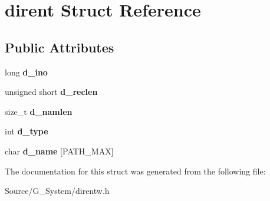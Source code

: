 \hypertarget{structdirent}{}\section{dirent Struct Reference}
\label{structdirent}
\subsection*{Public Attributes}
\begin{DoxyCompactItemize}
\item 
long {\bfseries d\+\_\+ino}\hypertarget{structdirent_acb6fecfb0e0f6fdc226dff8d56c3da4a}{}\label{structdirent_acb6fecfb0e0f6fdc226dff8d56c3da4a}

\item 
unsigned short {\bfseries d\+\_\+reclen}\hypertarget{structdirent_a90dc47836e8ef510437317876368859e}{}\label{structdirent_a90dc47836e8ef510437317876368859e}

\item 
size\+\_\+t {\bfseries d\+\_\+namlen}\hypertarget{structdirent_a09ced068b03cdb339e34840c8b709621}{}\label{structdirent_a09ced068b03cdb339e34840c8b709621}

\item 
int {\bfseries d\+\_\+type}\hypertarget{structdirent_ad6a736cb04c7295e8f97f708324b3500}{}\label{structdirent_ad6a736cb04c7295e8f97f708324b3500}

\item 
char {\bfseries d\+\_\+name} \mbox{[}P\+A\+T\+H\+\_\+\+M\+AX\mbox{]}\hypertarget{structdirent_a6c68ac080755453ec52de202e91de59b}{}\label{structdirent_a6c68ac080755453ec52de202e91de59b}

\end{DoxyCompactItemize}


The documentation for this struct was generated from the following file\+:\begin{DoxyCompactItemize}
\item 
Source/\+G\+\_\+\+System/direntw.\+h\end{DoxyCompactItemize}
